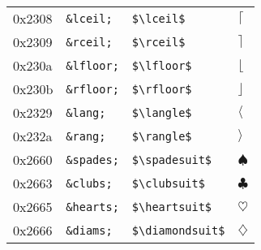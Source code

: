 \documentclass[a4paper,11pt]{article}
\begin{document}
{\begin{xtabular}{|l||l|l|l|}
0x2308&\texttt{\&lceil;}&\texttt{\$\textbackslash lceil\$}&$\lceil$\\ 
0x2309&\texttt{\&rceil;}&\texttt{\$\textbackslash rceil\$}&$\rceil$\\ 
0x230a&\texttt{\&lfloor;}&\texttt{\$\textbackslash lfloor\$}&$\lfloor$\\ 
0x230b&\texttt{\&rfloor;}&\texttt{\$\textbackslash rfloor\$}&$\rfloor$\\ 
0x2329&\texttt{\&lang;}&\texttt{\$\textbackslash langle\$}&$\langle$\\ 
0x232a&\texttt{\&rang;}&\texttt{\$\textbackslash rangle\$}&$\rangle$\\ 
0x2660&\texttt{\&spades;}&\texttt{\$\textbackslash spadesuit\$}&$\spadesuit$\\ 
0x2663&\texttt{\&clubs;}&\texttt{\$\textbackslash clubsuit\$}&$\clubsuit$\\ 
0x2665&\texttt{\&hearts;}&\texttt{\$\textbackslash heartsuit\$}&$\heartsuit$\\ 
0x2666&\texttt{\&diams;}&\texttt{\$\textbackslash diamondsuit\$}&$\diamondsuit$\\ 
\hline
    \end{xtabular}
    } 
\end{document}
